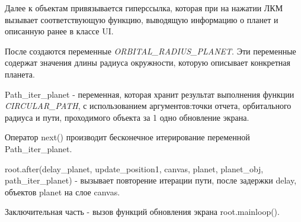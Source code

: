 \documentclass[11pt,a4paper]{report}
\begin{document}
Далее к объектам привязывается гиперссылка, которая при на нажатии ЛКМ вызывает соответствующую функцию, выводящую информацию о планет и  описанную ранее в классе UI.  

После создаются переменные \textit{ORBITAL\_RADIUS\_PLANET}. Эти переменные содержат значения длины радиуса окружности, которую описывает конкретная планета.

Path\_iter\_planet  - переменная, которая хранит результат выполнения функции \textit{CIRCULAR\_PATH}, с использованием аргументов:точки отчета, орбитального радиуса и пути, проходимого объекта за 1 одно обновление экрана.

Оператор next() производит бесконечное итерирование переменной Path\_iter\_planet.

root.after(delay\_planet, update\_position1, canvas, planet, planet\_obj, path\_iter\_planet) - вызывает повторение итерации пути, после задержки delay, объектов planet на слое canvas.

Заключительная часть - вызов функций обновления экрана root.mainloop().












\newpage
\end{document}
